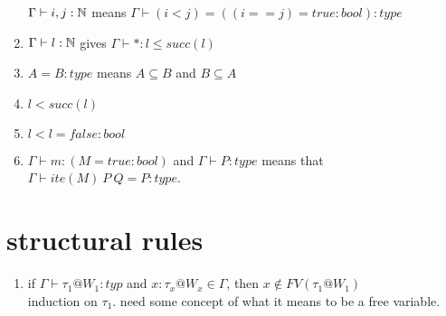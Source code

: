\documentclass{article}
\begin{document}
\begin{enumerate}
       $\Gamma \vdash i, j : \mathbb{N}$ means $\Gamma \vdash (i < j) = ((i == j) = true : bool) : type$
      \item $\Gamma \vdash l : \mathbb{N}$ gives $\Gamma \vdash * : l \leq succ(l)$
      \item $A = B : type$ means $A \subseteq B$ and $B \subseteq A$
      \item $l < succ(l)$
      \item $l < l = false: bool$
      \item $\Gamma \vdash m: (M = true : bool)$
    and $\Gamma \vdash P : type$ means that
        $\Gamma \vdash ite (M) \: P\: Q = P : type$.
\end{enumerate}

\section*{structural rules}
\begin{enumerate}
    \item if $\Gamma \vdash \tau_1 @ W_1 :typ$ and $x: \tau_x @ W_x \in \Gamma$, then $x \notin FV(\tau_1 @ W_1)$\\
    induction on $\tau_1$. need some concept of what it means to be a free variable. 
\end{enumerate}
\end{document}
